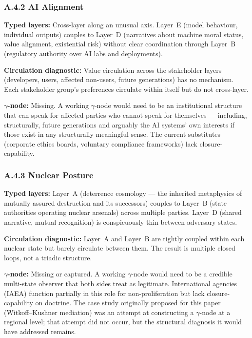 \documentclass[
]{article}
\begin{document}
\subsubsection*{A.4.2 AI Alignment}

\textbf{Typed layers:} Cross-layer along an unusual axis. Layer~E
(model behaviour, individual outputs) couples to Layer~D (narratives
about machine moral status, value alignment, existential risk) without
clear coordination through Layer~B (regulatory authority over AI
labs and deployments).

\textbf{Circulation diagnostic:} Value circulation across the
stakeholder layers (developers, users, affected non-users, future
generations) has no mechanism. Each stakeholder group's preferences
circulate within itself but do not cross-layer.

\textbf{\(\gamma\)-node:} Missing. A working \(\gamma\)-node would need
to be an institutional structure that can speak for affected parties
who cannot speak for themselves --- including, structurally, future
generations and arguably the AI systems' own interests if those exist
in any structurally meaningful sense. The current substitutes
(corporate ethics boards, voluntary compliance frameworks) lack
closure-capability.

\subsubsection*{A.4.3 Nuclear Posture}

\textbf{Typed layers:} Layer~A (deterrence cosmology --- the inherited
metaphysics of mutually assured destruction and its successors)
couples to Layer~B (state authorities operating nuclear arsenals)
across multiple parties. Layer~D (shared narrative, mutual
recognition) is conspicuously thin between adversary states.

\textbf{Circulation diagnostic:} Layer~A and Layer~B are tightly
coupled within each nuclear state but barely circulate between them.
The result is multiple closed loops, not a triadic structure.

\textbf{\(\gamma\)-node:} Missing or captured. A working
\(\gamma\)-node would need to be a credible multi-state observer that
both sides treat as legitimate. International agencies (IAEA) function
partially in this role for non-proliferation but lack closure-capability
on doctrine. The case study originally proposed for this paper
(Witkoff--Kushner mediation) was an attempt at constructing a
\(\gamma\)-node at a regional level; that attempt did not occur, but
the structural diagnosis it would have addressed remains.
\end{document}
